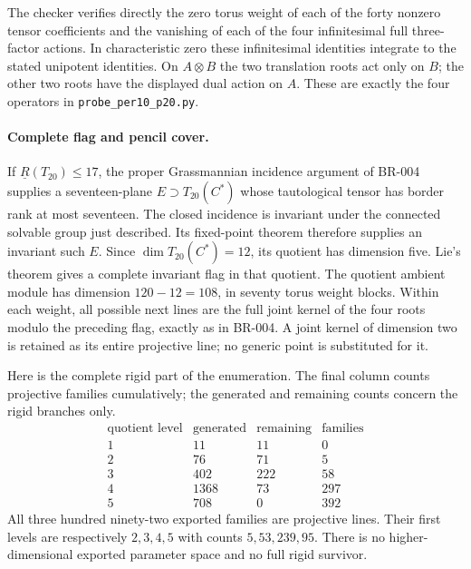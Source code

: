 The checker verifies directly the zero torus weight of each of the
forty nonzero tensor coefficients and the vanishing of each of the
four infinitesimal full three-factor actions.  In characteristic zero
these infinitesimal identities integrate to the stated unipotent
identities.  On $A\otimes B$ the two translation roots act only on
$B$; the other two roots have the displayed dual action on $A$.
These are exactly the four operators in
\texttt{probe\_per10\_p20.py}.

\paragraph{Complete flag and pencil cover.}
If $\underline R(T_{20})\le17$, the proper Grassmannian incidence
argument of BR-004 supplies a seventeen-plane
$E\supset T_{20}(C^*)$ whose tautological tensor has border rank at
most seventeen.  The closed incidence is invariant under the
connected solvable group just described.  Its fixed-point theorem
therefore supplies an invariant such $E$.  Since
$\dim T_{20}(C^*)=12$, its quotient has dimension five.  Lie's theorem
gives a complete invariant flag in that quotient.  The quotient
ambient module has dimension $120-12=108$, in seventy torus weight
blocks.  Within each weight, all possible next lines are the full
joint kernel of the four roots modulo the preceding flag, exactly
as in BR-004.  A joint kernel of dimension two is retained as its
entire projective line; no generic point is substituted for it.

Here is the complete rigid part of the enumeration.  The final column
counts projective families cumulatively; the generated and remaining
counts concern the rigid branches only.
\[
\begin{array}{c|r|r|r}
\text{quotient level}&\text{generated}&\text{remaining}&\text{families}\\\hline
1&11&11&0\\
2&76&71&5\\
3&402&222&58\\
4&1368&73&297\\
5&708&0&392
\end{array}
\]
All three hundred ninety-two exported families are projective lines.
Their first levels are respectively $2,3,4,5$ with counts
$5,53,239,95$.  There is no higher-dimensional exported parameter
space and no full rigid survivor.

